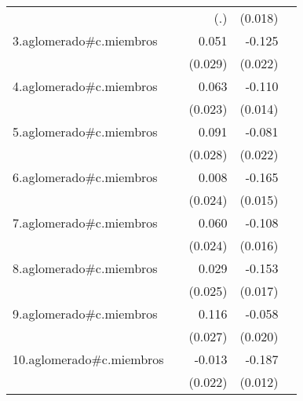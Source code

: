 {\begin{longtable}{l*{4}{D{.}{.}{-1}}}
            &                     &         (.)         &     (0.018)         &                     \\
\addlinespace
3.aglomerado#c.miembros&                     &       0.051         &      -0.125\sym{***}&                     \\
            &                     &     (0.029)         &     (0.022)         &                     \\
\addlinespace
4.aglomerado#c.miembros&                     &       0.063\sym{**} &      -0.110\sym{***}&                     \\
            &                     &     (0.023)         &     (0.014)         &                     \\
\addlinespace
5.aglomerado#c.miembros&                     &       0.091\sym{**} &      -0.081\sym{***}&                     \\
            &                     &     (0.028)         &     (0.022)         &                     \\
\addlinespace
6.aglomerado#c.miembros&                     &       0.008         &      -0.165\sym{***}&                     \\
            &                     &     (0.024)         &     (0.015)         &                     \\
\addlinespace
7.aglomerado#c.miembros&                     &       0.060\sym{*}  &      -0.108\sym{***}&                     \\
            &                     &     (0.024)         &     (0.016)         &                     \\
\addlinespace
8.aglomerado#c.miembros&                     &       0.029         &      -0.153\sym{***}&                     \\
            &                     &     (0.025)         &     (0.017)         &                     \\
\addlinespace
9.aglomerado#c.miembros&                     &       0.116\sym{***}&      -0.058\sym{**} &                     \\
            &                     &     (0.027)         &     (0.020)         &                     \\
\addlinespace
10.aglomerado#c.miembros&                     &      -0.013         &      -0.187\sym{***}&                     \\
            &                     &     (0.022)         &     (0.012)         &                     \\

\end{longtable}}
